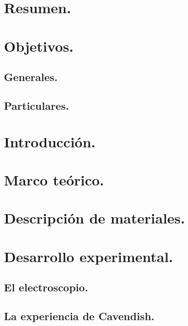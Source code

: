 \documentclass[spanish,10pt,a4paper,onecolumn]{article}
\begin{document}
\tableofcontents
\newpage



\section{Resumen.}



\section{Objetivos.}

\subsection{Generales.}

\subsection{Particulares.}



\section{Introducción.}



\section{Marco teórico.}



\section{Descripción de materiales.}



\section{Desarrollo experimental.}

\subsection{El electroscopio.}

\subsection{La experiencia de Cavendish.}
\end{document}
